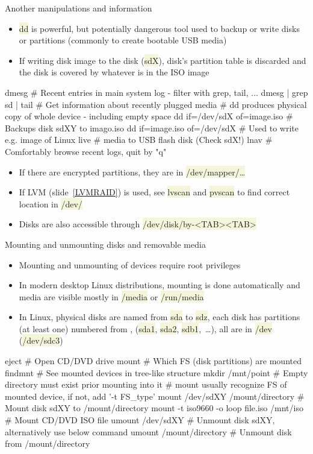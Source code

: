 \documentclass[compress, ucs, xelatex, 11pt, xcolor=svgnames, aspectratio=169,
	hyperref={
		bookmarks=true,
		unicode=true,
		colorlinks=true,
		pdftitle={Linux, command line and MetaCentrum},
		plainpages=false,
		pdfauthor={Vojtech Zeisek},
		pdfsubject={Course about use of Linux command line, writing shell scripts and using MetaCentrum of CESNET},
		pdfcreator={XeLaTeX},
		pdfkeywords={Linux, GNU, BASH, shell, command line, MetaCentrum},
		linkcolor=DarkRed, %
		anchorcolor=DarkBlue, %
		citecolor=Indigo, %
		filecolor=NavyBlue, %
		menucolor=DarkMagenta, %
		urlcolor=DarkBlue, %
		pdftex},
	url={hyphens, lowtilde} %
	]{beamer}
\renewcommand{\texttt}[1]{\colorbox{Beige}{{\ttfamily #1}}}
\begin{document}
\begin{frame}[fragile]{Another manipulations and information}
	\begin{itemize}
		\item \texttt{dd} is powerful, but potentially dangerous tool used to backup or write disks or partitions (commonly to create bootable USB media)
		\item If writing disk image to the disk (\texttt{sdX}), disk's partition table is discarded and the disk is covered by whatever is in the ISO image
	\end{itemize}
	\begin{bashcode}
    dmesg # Recent entries in main system log - filter with grep, tail, ...
    dmesg | grep sd | tail # Get information about recently plugged media
    # dd produces physical copy of whole device - including empty space
    dd if=/dev/sdX of=image.iso # Backups disk sdXY to imago.iso
    dd if=image.iso of=/dev/sdX # Used to write e.g. image of Linux live
                                # media to USB flash disk (Check sdX!)
    lnav # Comfortably browse recent logs, quit by "q"
	\end{bashcode}
	\begin{itemize}
		\item If there are encrypted partitions, they are in \texttt{/dev/mapper/\ldots}
		\item If LVM (slide~\ref{LVMRAID}) is used, see \texttt{lvscan} and \texttt{pvscan} to find correct location in \texttt{/dev/}
		\item Disks are also accessible through \texttt{/dev/disk/by-<TAB><TAB>}
	\end{itemize}
\end{frame}

\begin{frame}[fragile]{Mounting and unmounting disks and removable media}
	\begin{itemize}
		\item Mounting and unmounting of devices require root privileges
		\item In modern desktop Linux distributions, mounting is done automatically and media are visible mostly in \texttt{/media} or \texttt{/run/media}
		\item In Linux, physical disks are named from \texttt{sda} to \texttt{sdz}, each disk has partitions (at least one) numbered from \texttt{1}, (\texttt{sda1}, \texttt{sda2}, \texttt{sdb1},~\ldots), all are in \texttt{/dev} (\texttt{/dev/sdc3})
	\end{itemize}
	\begin{bashcode}
    eject # Open CD/DVD drive
    mount # Which FS (disk partitions) are mounted
    findmnt # See mounted devices in tree-like structure
    mkdir /mnt/point # Empty directory must exist prior mounting into it
    # mount usually recognize FS of mounted device, if not, add '-t FS_type'
    mount /dev/sdXY /mount/directory # Mount disk sdXY to /mount/directory
    mount -t iso9660 -o loop file.iso /mnt/iso # Mount CD/DVD ISO file
    umount /dev/sdXY # Unmount disk sdXY, alternatively use below command
    umount /mount/directory # Unmount disk from /mount/directory
	\end{bashcode}
\end{frame}
\end{document}
